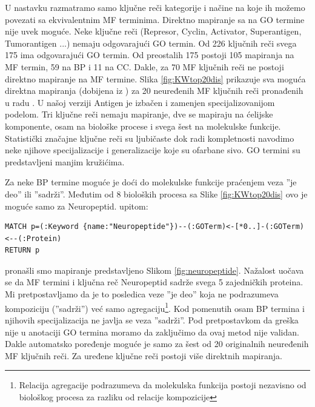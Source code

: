 U nastavku razmatramo samo ključne reči kategorije  i načine na koje ih možemo povezati sa ekvivalentnim MF terminima.
Direktno mapiranje sa  na GO
termine nije uvek moguće.  Neke ključne reči (Represor, Cyclin, Activator,
Superantigen, Tumorantigen ...) nemaju odgovarajući GO termin. Od 226
ključnih reči svega 175 ima odgovarajući GO termin. Od preostalih 175
postoji 105 mapiranja na MF termin, 59 na BP
i 11 na CC.  Dakle, za 70 MF ključnih reči ne postoji direktno mapiranje na MF
termine.  Slika \ref{fig:KWtop20dis} prikazuje sva moguća direktna mapiranja
(dobijena iz ) za 20 neuređenih MF ključnih reči pronađenih
u radu \parencite{Xie2007}.  U našoj verziji  Antigen je
izbačen i zamenjen specijalizovanijom podelom. Tri ključne reči nemaju
mapiranje, dve se mapiraju na ćelijske komponente, osam na biološke procese i
svega šest na molekulske funkcije. Statistički značajne ključne reči su
ljubičaste dok radi kompletnosti navodimo neke njihove specijalizacije i
generalizacije koje su ofarbane sivo. GO termini su predstavljeni manjim
kružićima. 

Za neke BP termine moguće je doći do molekulske funkcije praćenjem veza ''je
deo'' ili ''sadrži''. Međutim od 8 bioloških procesa sa Slike
\ref{fig:KWtop20dis} ovo je moguće samo za Neuropeptid.
 upitom:
\begin{verbatim}
MATCH p=(:Keyword {name:"Neuropeptide"})--(:GOTerm)<-[*0..]-(:GOTerm)<--(:Protein)
RETURN p
\end{verbatim}
pronašli smo mapiranje predstavljeno Slikom \ref{fig:neuropeptide}. Nažalost
uočava se da MF termini i ključna reč Neuropeptid sadrže svega 5 zajedničkih
proteina. Mi pretpostavljamo da je to posledica veze ''je deo'' koja ne
podrazumeva kompoziciju (''sadrži'') već samo agregaciju\footnote{ Relacija
agregacije podrazumeva da molekulska funkcija postoji nezavisno od biološkog
procesa za razliku od relacije kompozicije}. Kod pomenutih osam BP termina i njihovih
specijalizacija ne javlja se veza ''sadrži''. Pod pretpostavkom da greška nije
u anotaciji GO termina moramo da zaključimo da ovaj metod nije validan.
Dakle automatsko poređenje moguće je samo za šest od 20 originalnih neuređenih MF 
ključnih reči. Za uređene ključne reči postoji više direktnih mapiranja.

